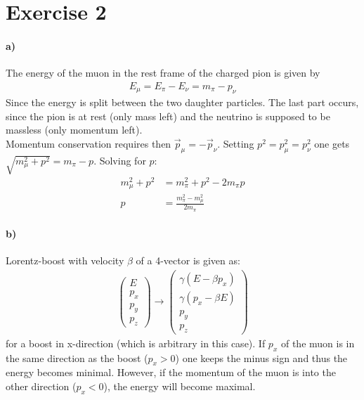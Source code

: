 \documentclass[10pt,a4paper]{article}
\begin{document}
\section*{Exercise 2}
\paragraph{a)}
The energy of the muon in the rest frame of the charged pion is given by
\begin{align*}
E_\mu = E_\pi - E_\nu = m_\pi - p_\nu
\end{align*}
Since the energy is split between the two daughter particles. The last part occurs, since the pion is at rest (only mass left) and the neutrino is supposed to be massless (only momentum left).\\
Momentum conservation requires then $\vec{p}_\mu = -\vec{p}_\nu$. Setting $p^2 = p_\mu^2 = p_\nu^2$ one gets $\sqrt{m_\mu^2+p^2} = m_\pi - p$.
Solving for $p$:
\begin{align*}
m_\mu^2 + p^2 &= m_\pi^2 + p^2 - 2 m_\pi p\\
p &= \frac{m_\pi^2 - m_\mu^2}{2m_\pi}
\end{align*}
\paragraph{b)}
Lorentz-boost with velocity $\beta$ of a 4-vector is given as:
\begin{align*}
\begin{pmatrix}
E \\ p_x \\ p_y \\ p_z
\end{pmatrix}
\rightarrow 
\begin{pmatrix}
\gamma ( E - \beta p_x) \\ \gamma (p_x - \beta E) \\ p_y \\ p_z
\end{pmatrix}
\end{align*}
for a boost in x-direction (which is arbitrary in this case).
If $p_x$ of the muon is in the same direction as the boost ($p_x > 0$) one keeps the minus sign and thus the energy becomes minimal. However, if the momentum of the muon is into the other direction ($p_x < 0$), the energy will become maximal. 
\end{document}

